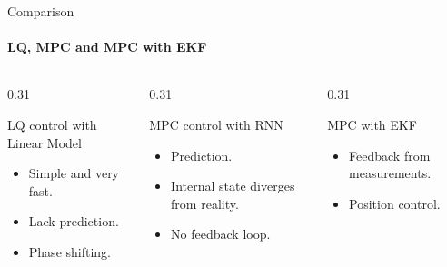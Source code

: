 
\begin{frame}{Comparison}
    \framesubtitle{LQ, MPC and MPC with EKF}

    \begin{columns}[T,onlytextwidth]
        \begin{column}{0.31\textwidth}
            \begin{block}{LQ control with Linear Model}
                \begin{itemize}
                    \item Simple and very fast.
                    \item Lack prediction.
                    \item Phase shifting.
                \end{itemize}
            \end{block}
        \end{column}

        \begin{column}{0.31\textwidth}
            \begin{block}{MPC control with RNN}
                \begin{itemize}
                    \item Prediction.
                    \item Internal state diverges from reality.
                    \item No feedback loop.
                \end{itemize}
            \end{block}
        \end{column}

        \begin{column}{0.31\textwidth}
            \begin{exampleblock}{MPC with EKF}
                \begin{itemize}
                    \item Feedback from measurements.
                    \item Position control. 
                \end{itemize}
            \end{exampleblock}
        \end{column}
    \end{columns}
\end{frame}
